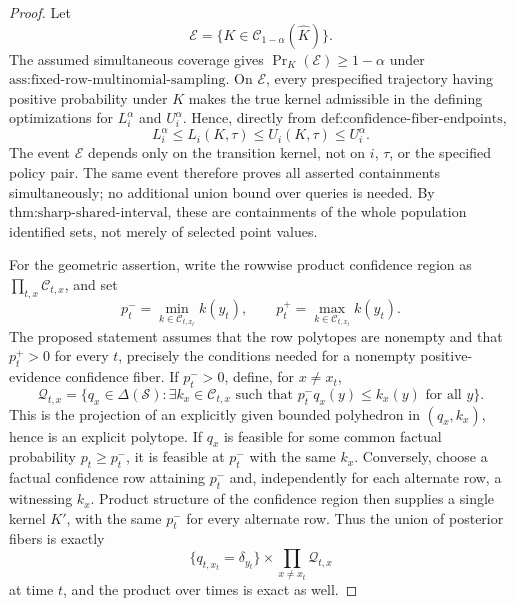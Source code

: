 \documentclass{article}
\begin{document}
\begin{proof}
Let
\[
 \mathcal E=\{K\in\mathcal C_{1-\alpha}(\widehat K)\}.
\]
The assumed simultaneous coverage gives \(\Pr_K(\mathcal E)\ge1-\alpha\) under \(\text{ass:fixed-row-multinomial-sampling}\).  On \(\mathcal E\), every prespecified trajectory having positive probability under \(K\) makes the true kernel admissible in the defining optimizations for \(L_i^\alpha\) and \(U_i^\alpha\).  Hence, directly from \(\text{def:confidence-fiber-endpoints}\),
\[
 L_i^\alpha\le L_i(K,\tau)\le U_i(K,\tau)\le U_i^\alpha.
\]
The event \(\mathcal E\) depends only on the transition kernel, not on \(i\), \(\tau\), or the specified policy pair.  The same event therefore proves all asserted containments simultaneously; no additional union bound over queries is needed.  By \(\text{thm:sharp-shared-interval}\), these are containments of the whole population identified sets, not merely of selected point values.

For the geometric assertion, write the rowwise product confidence region as \(\prod_{t,x}\mathcal C_{t,x}\), and set
\[
 p_t^- =\min_{k\in\mathcal C_{t,x_t}}k(y_t),
 \qquad
 p_t^+ =\max_{k\in\mathcal C_{t,x_t}}k(y_t).
\]
The proposed statement assumes that the row polytopes are nonempty and that \(p_t^+>0\) for every \(t\), precisely the conditions needed for a nonempty positive-evidence confidence fiber.  If \(p_t^->0\), define, for \(x\ne x_t\),
\[
 \mathcal Q_{t,x}
 =\{q_x\in\Delta(\mathcal S):
       \exists k_x\in\mathcal C_{t,x}\text{ such that }
       p_t^-q_x(y)\le k_x(y)\text{ for all }y\}.
\]
This is the projection of an explicitly given bounded polyhedron in \((q_x,k_x)\), hence is an explicit polytope.  If \(q_x\) is feasible for some common factual probability \(p_t\ge p_t^-\), it is feasible at \(p_t^-\) with the same \(k_x\).  Conversely, choose a factual confidence row attaining \(p_t^-\) and, independently for each alternate row, a witnessing \(k_x\).  Product structure of the confidence region then supplies a single kernel \(K'\), with the same \(p_t^-\) for every alternate row.  Thus the union of posterior fibers is exactly
\[
 \{q_{t,x_t}=\delta_{y_t}\}\times
 \prod_{x\ne x_t}\mathcal Q_{t,x}
\]
at time \(t\), and the product over times is exact as well.


\end{proof}
\end{document}
